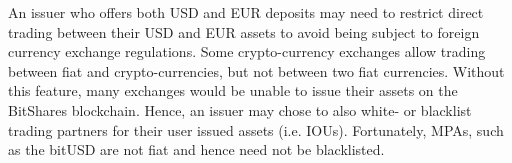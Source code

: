 An issuer who offers both USD and EUR deposits may need to restrict direct
trading between their USD and EUR assets to avoid being subject to foreign
currency exchange regulations. Some crypto-currency exchanges allow trading
between fiat and crypto-currencies, but not between two fiat currencies.
Without this feature, many exchanges would be unable to issue their assets on
the BitShares blockchain. Hence, an issuer may chose to also white- or
blacklist trading partners for their user issued assets (i.e. IOUs).
Fortunately, MPAs, such as the bitUSD are not fiat and hence need not be
blacklisted.

